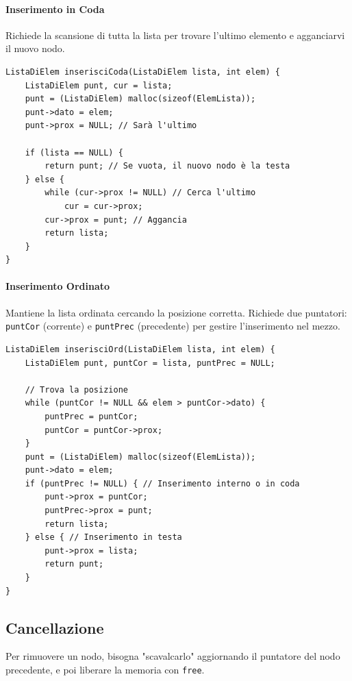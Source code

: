 \documentclass[oneside]{scrbook}
\begin{document}
\paragraph{Inserimento in Coda}
Richiede la scansione di tutta la lista per trovare l'ultimo elemento e agganciarvi il nuovo nodo.

\begin{lstlisting}[style=cstyle]
ListaDiElem inserisciCoda(ListaDiElem lista, int elem) {
    ListaDiElem punt, cur = lista;
    punt = (ListaDiElem) malloc(sizeof(ElemLista));
    punt->dato = elem;
    punt->prox = NULL; // Sarà l'ultimo

    if (lista == NULL) {
        return punt; // Se vuota, il nuovo nodo è la testa
    } else {
        while (cur->prox != NULL) // Cerca l'ultimo
            cur = cur->prox;
        cur->prox = punt; // Aggancia
        return lista;
    }
}
\end{lstlisting}

\paragraph{Inserimento Ordinato}
Mantiene la lista ordinata cercando la posizione corretta. Richiede due puntatori: \texttt{puntCor} (corrente) e \texttt{puntPrec} (precedente) per gestire l'inserimento nel mezzo.

\begin{lstlisting}[style=cstyle]
ListaDiElem inserisciOrd(ListaDiElem lista, int elem) {
    ListaDiElem punt, puntCor = lista, puntPrec = NULL;
    
    // Trova la posizione
    while (puntCor != NULL && elem > puntCor->dato) {
        puntPrec = puntCor;
        puntCor = puntCor->prox;
    }
    punt = (ListaDiElem) malloc(sizeof(ElemLista));
    punt->dato = elem;
    if (puntPrec != NULL) { // Inserimento interno o in coda
        punt->prox = puntCor;
        puntPrec->prox = punt;
        return lista;
    } else { // Inserimento in testa
        punt->prox = lista;
        return punt;
    }
}
\end{lstlisting}

\subsection{Cancellazione}

Per rimuovere un nodo, bisogna "scavalcarlo" aggiornando il puntatore del nodo precedente, e poi liberare la memoria con \texttt{free}.
\end{document}
